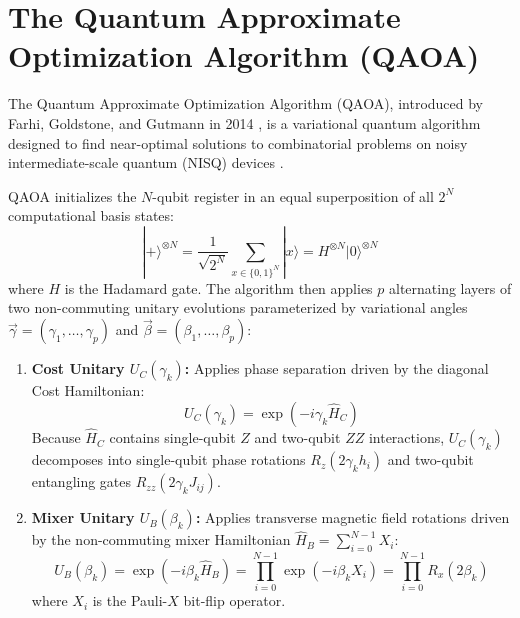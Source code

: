 \section{The Quantum Approximate Optimization Algorithm (QAOA)}
The Quantum Approximate Optimization Algorithm (QAOA), introduced by Farhi, Goldstone, and Gutmann in 2014 \cite{farhi2014quantum}, is a variational quantum algorithm designed to find near-optimal solutions to combinatorial problems on noisy intermediate-scale quantum (NISQ) devices \cite{preskill2018quantum, cerezo2021variational}.

QAOA initializes the $N$-qubit register in an equal superposition of all $2^N$ computational basis states:
\begin{equation}
|+\rangle^{\otimes N} = \frac{1}{\sqrt{2^N}} \sum_{x \in \{0, 1\}^N} |x\rangle = H^{\otimes N} |0\rangle^{\otimes N}
\end{equation}
where $H$ is the Hadamard gate. The algorithm then applies $p$ alternating layers of two non-commuting unitary evolutions parameterized by variational angles $\vec{\gamma} = (\gamma_1, \dots, \gamma_p)$ and $\vec{\beta} = (\beta_1, \dots, \beta_p)$:

\begin{enumerate}
    \item \textbf{Cost Unitary $U_C(\gamma_k)$:} Applies phase separation driven by the diagonal Cost Hamiltonian:
    \begin{equation}
    U_C(\gamma_k) = \exp\left( -i \gamma_k \hat{H}_C \right)
    \end{equation}
    Because $\hat{H}_C$ contains single-qubit $Z$ and two-qubit $ZZ$ interactions, $U_C(\gamma_k)$ decomposes into single-qubit phase rotations $R_z(2\gamma_k h_i)$ and two-qubit entangling gates $R_{zz}(2\gamma_k J_{ij})$.
    
    \item \textbf{Mixer Unitary $U_B(\beta_k)$:} Applies transverse magnetic field rotations driven by the non-commuting mixer Hamiltonian $\hat{H}_B = \sum_{i=0}^{N-1} X_i$:
    \begin{equation}
    U_B(\beta_k) = \exp\left( -i \beta_k \hat{H}_B \right) = \prod_{i=0}^{N-1} \exp\left( -i \beta_k X_i \right) = \prod_{i=0}^{N-1} R_x(2\beta_k)
    \end{equation}
    where $X_i$ is the Pauli-$X$ bit-flip operator.
\end{enumerate}


